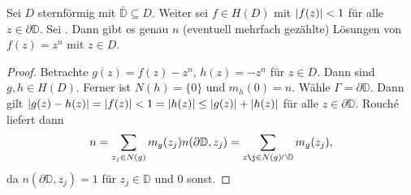 \documentclass[a4paper,twoside,DIV15,BCOR12mm]{scrbook}
\begin{document}
\begin{bsp}\label{bsp3.19}
  Sei $D$ sternförmig mit $\bar{\mathbb{D}}\subseteq D$. Weiter sei $f\in H(D)$ mit $\left\lvert f(z)\right\lvert<1$ für alle
  $z\in \partial\mathbb{D}$. Sei . Dann gibt es genau $n$ (eventuell mehrfach gezählte) Lösungen von $f(z)=z^n$ mit $z\in D$.
\end{bsp}
\begin{proof}
  Betrachte $g(z)=f(z)-z^n$, $h(z)=-z^n$ für $z\in D$. Dann sind $g, h\in H(D)$. Ferner ist $N(h)=\{0\}$ und $m_h(0)=n$. Wähle
  $\Gamma=\partial\mathbb{D}$. Dann gilt $\left\lvert g(z)-h(z)\right\lvert = \left\lvert f(z)\right\lvert < 1 = \left\lvert h(z)\right\lvert \leq \left\lvert g(z)\right\lvert + \left\lvert h(z)\right\lvert$ für alle
  $z\in\partial\mathbb{D}$. Rouch\'e liefert dann \[ n = \sum_{z_j\in N(g)}{m_g(z_j) n(\partial\mathbb{D}, z_j)} = \sum_{z\j\in
    N(g)\cap\mathbb{D}}{m_g(z_j)}, \] da $n(\partial\mathbb{D}, z_j) = 1$ für $z_j\in\mathbb{D}$ und $0$ sonst.
\end{proof}
\end{document}
